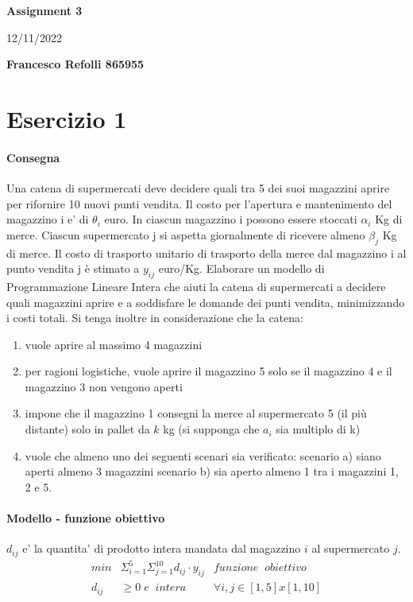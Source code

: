 \documentclass[a4paper,12pt,oneside]{article}
\begin{document}
    \thispagestyle{plain}
    \begin{center}
        \normalsize
        \textbf{Assignment 3}
            
        \vspace{0.2cm}
        \normalsize
        12/11/2022
            
        \vspace{0.2cm}
        \textbf{Francesco Refolli 865955}
    \end{center}

    \section{Esercizio 1}

    \paragraph{Consegna}

    Una catena di supermercati deve decidere quali tra 5 dei suoi magazzini aprire per rifornire 10 nuovi punti vendita. Il costo per l’apertura e mantenimento del magazzino i e' di $\theta_i$ euro. In ciascun magazzino i possono essere stoccati $\alpha_i$ Kg di merce. Ciascun supermercato j si aspetta giornalmente di ricevere almeno $\beta_j$ Kg di merce. Il costo di trasporto unitario di trasporto della merce dal magazzino i al punto vendita j è stimato a $y_{ij}$ euro/Kg. Elaborare un modello di Programmazione Lineare Intera che aiuti la catena di supermercati a decidere quali magazzini aprire e a soddisfare le domande dei punti vendita, minimizzando i costi totali.
    Si tenga inoltre in considerazione che la catena:
    \begin{enumerate}
        \item vuole aprire al massimo 4 magazzini
        \item per ragioni logistiche, vuole aprire il magazzino 5 solo se il magazzino 4 e il magazzino 3 non vengono aperti
        \item impone che il magazzino 1 consegni la merce al supermercato 5 (il più distante) solo in pallet da $k$ kg (si supponga che $a_i$ sia multiplo di k)
        \item vuole che almeno uno dei seguenti scenari sia verificato: scenario a) siano aperti almeno 3 magazzini scenario b) sia aperto almeno 1 tra i magazzini 1, 2 e 5.
    \end{enumerate}

    \paragraph{Modello - funzione obiettivo}
    $d_{ij}$ e' la quantita' di prodotto intera mandata dal magazzino $i$ al supermercato $j$.
    \begin{align*}
        min & \Sigma ^ {5} _ {i=1} \Sigma ^ {10} _ {j=1} d_{ij} \cdot y_{ij} & funzione \;\; obiettivo \\
        d_{ij} &\geq 0 \; e \;\; intera & \forall i,j \in [1,5] x [1,10]
    \end{align*}
\end{document}
